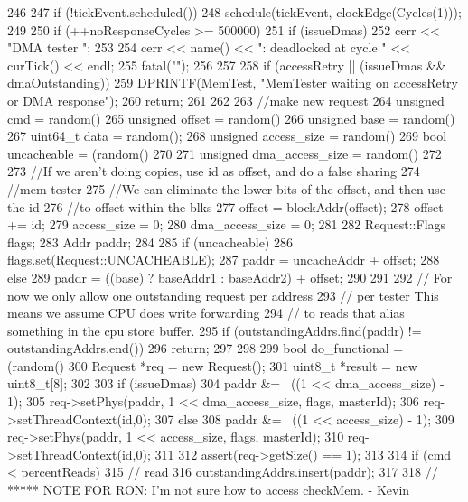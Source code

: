 \begin{DoxyCode}
246 {
247     if (!tickEvent.scheduled())
248         schedule(tickEvent, clockEdge(Cycles(1)));
249 
250     if (++noResponseCycles >= 500000) {
251         if (issueDmas) {
252             cerr << "DMA tester ";
253         }
254         cerr << name() << ": deadlocked at cycle " << curTick() << endl;
255         fatal("");
256     }
257 
258     if (accessRetry || (issueDmas && dmaOutstanding)) {
259         DPRINTF(MemTest, "MemTester waiting on accessRetry or DMA response\n");
260         return;
261     }
262 
263     //make new request
264     unsigned cmd = random() %
265     unsigned offset = random() %
266     unsigned base = random() %
267     uint64_t data = random();
268     unsigned access_size = random() %
269     bool uncacheable = (random() %
270 
271     unsigned dma_access_size = random() %
272 
273     //If we aren't doing copies, use id as offset, and do a false sharing
274     //mem tester
275     //We can eliminate the lower bits of the offset, and then use the id
276     //to offset within the blks
277     offset = blockAddr(offset);
278     offset += id;
279     access_size = 0;
280     dma_access_size = 0;
281 
282     Request::Flags flags;
283     Addr paddr;
284 
285     if (uncacheable) {
286         flags.set(Request::UNCACHEABLE);
287         paddr = uncacheAddr + offset;
288     } else  {
289         paddr = ((base) ? baseAddr1 : baseAddr2) + offset;
290     }
291 
292     // For now we only allow one outstanding request per address
293     // per tester This means we assume CPU does write forwarding
294     // to reads that alias something in the cpu store buffer.
295     if (outstandingAddrs.find(paddr) != outstandingAddrs.end()) {
296         return;
297     }
298 
299     bool do_functional = (random() %
300     Request *req = new Request();
301     uint8_t *result = new uint8_t[8];
302 
303     if (issueDmas) {
304         paddr &= ~((1 << dma_access_size) - 1);
305         req->setPhys(paddr, 1 << dma_access_size, flags, masterId);
306         req->setThreadContext(id,0);
307     } else {
308         paddr &= ~((1 << access_size) - 1);
309         req->setPhys(paddr, 1 << access_size, flags, masterId);
310         req->setThreadContext(id,0);
311     }
312     assert(req->getSize() == 1);
313 
314     if (cmd < percentReads) {
315         // read
316         outstandingAddrs.insert(paddr);
317 
318         // ***** NOTE FOR RON: I'm not sure how to access checkMem. - Kevin
}}
\end{DoxyCode}
